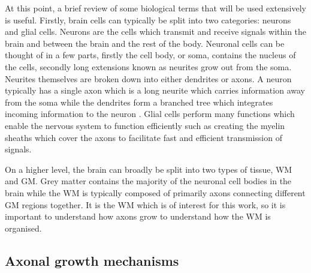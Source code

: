 At this point, a brief review of some biological terms that will be used extensively is useful. Firstly, brain cells can typically be split into two categories: neurons and glial cells. Neurons are the cells which transmit and receive signals within the brain and between the brain and the rest of the body. Neuronal cells can be thought of in a few parts, firstly the cell body, or soma, contains the nucleus of the cells, secondly long extensions known as neurites grow out from the soma. Neurites themselves are broken down into either dendrites or axons. A neuron typically has a single axon which is a long neurite which carries information away from the soma while the dendrites form a branched tree which integrates incoming information to the neuron \cite{Price2017}. Glial cells perform many functions which enable the nervous system to function efficiently such as creating the myelin sheaths which cover the axons to facilitate fast and efficient transmission of signals.

On a higher level, the brain can broadly be split into two types of tissue, \acf{WM} and \acf{GM}. Grey matter contains the majority of the neuronal cell bodies in the brain while the \acl{WM} is typically composed of primarily axons connecting different \ac{GM} regions together. It is the \acl{WM} which is of interest for this work, so it is important to understand how axons grow to understand how the \ac{WM} is organised.

\subsection{Axonal growth mechanisms}
\label{sec:bg_axonal_growth}



